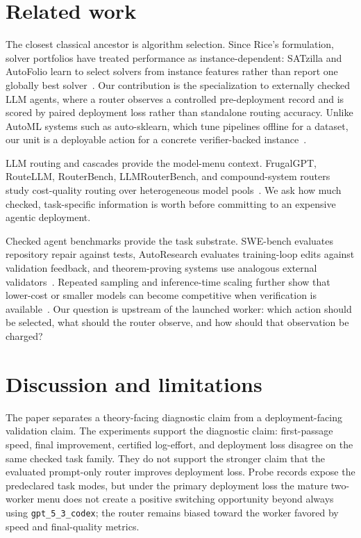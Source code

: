 \documentclass{article}
\newcounter{algorithm}
\begin{document}
\section{Related work}
\label{sec:related}

The closest classical ancestor is algorithm selection.
Since Rice's formulation, solver portfolios have treated performance as instance-dependent: SATzilla and AutoFolio learn to select solvers from instance features rather than report one globally best solver~\citep{rice1976algorithm,xu2012satzilla,lindauer2015autofolio,kotthoff2016algorithm}.
Our contribution is the specialization to externally checked LLM agents, where a router observes a controlled pre-deployment record and is scored by paired deployment loss rather than standalone routing accuracy.
Unlike AutoML systems such as auto-sklearn, which tune pipelines offline for a dataset, our unit is a deployable action for a concrete verifier-backed instance~\citep{feurer2015autosklearn}.

LLM routing and cascades provide the model-menu context.
FrugalGPT, RouteLLM, RouterBench, LLMRouterBench, and compound-system routers study cost-quality routing over heterogeneous model pools~\citep{chen2023frugalgpt,ong2024routellm,hu2024routerbench,anonymous2026llmrouterbench,chen2025optimizing,yue2025masrouter,zaharia2024compound}.
We ask how much checked, task-specific information is worth before committing to an expensive agentic deployment.

Checked agent benchmarks provide the task substrate.
SWE-bench evaluates repository repair against tests, AutoResearch evaluates training-loop edits against validation feedback, and theorem-proving systems use analogous external validators~\citep{jimenez2024swebench,karpathy2026autoresearch}.
Repeated sampling and inference-time scaling further show that lower-cost or smaller models can become competitive when verification is available~\citep{brown2024monkeys,snell2025testtime,wu2025inference,osca2024}.
Our question is upstream of the launched worker: which action should be selected, what should the router observe, and how should that observation be charged?

\section{Discussion and limitations}
\label{sec:discussion}

The paper separates a theory-facing diagnostic claim from a deployment-facing validation claim.
The experiments support the diagnostic claim: first-passage speed, final improvement, certified log-effort, and deployment loss disagree on the same checked task family.
They do not support the stronger claim that the evaluated prompt-only router improves deployment loss.
Probe records expose the predeclared task modes, but under the primary deployment loss the mature two-worker menu does not create a positive switching opportunity beyond always using \texttt{gpt\_5\_3\_codex}; the router remains biased toward the worker favored by speed and final-quality metrics.
\end{document}
